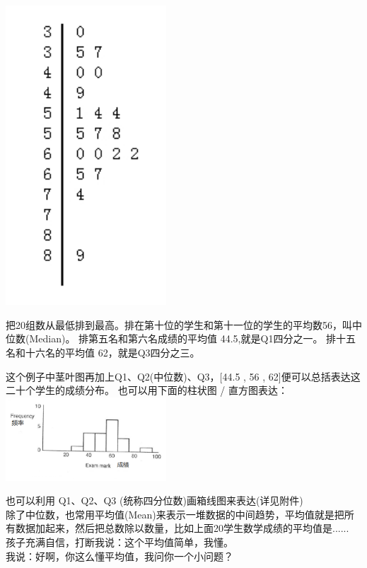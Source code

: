 \includegraphics[width=6cm]{MA_FA2_101.jpg}

把20组数从最低排到最高。排在第十位的学生和第十一位的学生的平均数56，叫中位数(Median)。
排第五名和第六名成绩的平均值 44.5,就是Q1四分之一。
排十五名和十六名的平均值 62，就是Q3四分之三。

这个例子中茎叶图再加上Q1、Q2(中位数)、Q3，{[}44.5 , 56 ,
62{]}便可以总括表达这二十个学生的成绩分布。 也可以用下面的柱状图 /
直方图表达：\\

\includegraphics[width=6cm]{MA_FA1_10.png}

也可以利用 Q1、Q2、Q3 (统称四分位数)画箱线图来表达(详见附件)\\
除了中位数，也常用平均值(Mean)来表示一堆数据的中间趋势，平均值就是把所有数据加起来，然后把总数除以数量，比如上面20学生数学成绩的平均值是......\\
孩子充满自信，打断我说：这个平均值简单，我懂。\\
我说：好啊，你这么懂平均值，我问你一个小问题？\\


